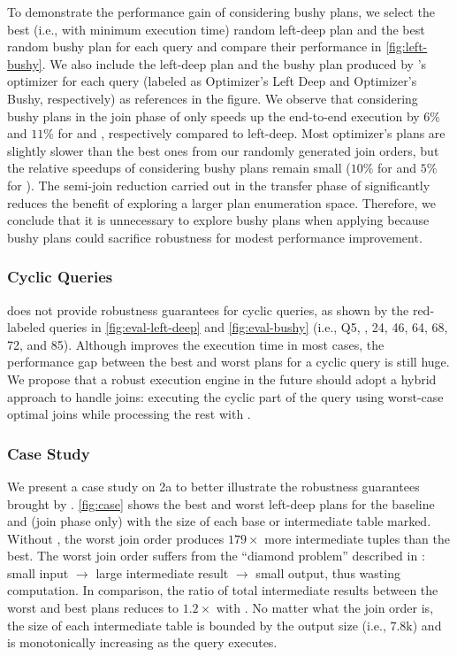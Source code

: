 To demonstrate the performance gain of considering bushy plans, we select the best (i.e., with minimum execution time) random left-deep plan and the best random bushy plan for each query and compare their performance in \cref{fig:left-bushy}. We also include the left-deep plan and the bushy plan produced by \duckdb's optimizer for each query (labeled as Optimizer's Left Deep and Optimizer's Bushy, respectively) as references in the figure. We observe that considering bushy plans in the join phase of \rpt only speeds up the end-to-end execution by $6\%$ and $11\%$ for \tpch and \job, respectively compared to left-deep. Most optimizer's plans are slightly slower than the best ones from our randomly generated join orders, but the relative speedups of considering bushy plans remain small ($10\%$ for \tpch and $5\%$ for \job).
The semi-join reduction carried out in the transfer phase of \rpt significantly reduces the benefit of exploring a larger plan enumeration space. Therefore, we conclude that it is unnecessary to explore bushy plans when applying \RPT because bushy plans could sacrifice robustness for modest performance improvement.


\subsubsection{Cyclic Queries}
\rpt does not provide robustness guarantees for cyclic queries, as shown by the red-labeled queries in \cref{fig:eval-left-deep} and \cref{fig:eval-bushy} (i.e., \tpch Q5, , 24, 46, 64, 68, 72, and 85). Although \rpt improves the execution time in most cases, the performance gap between the best and worst plans for a cyclic query is still huge. We propose that a robust execution engine in the future should adopt a hybrid approach to handle joins: executing the cyclic part of the query using worst-case optimal joins while processing the rest with \RPT.

\subsubsection{Case Study}
We present a case study on \job 2a to better illustrate the robustness guarantees brought by \rpt. \cref{fig:case} shows the best and worst left-deep plans for the baseline and \rpt (join phase only) with the size of each base or intermediate table marked. Without \rpt, the worst join order produces $179\times$ more intermediate tuples than the best. The worst join order suffers from the ``diamond problem'' described in \cite{birler2024robust}: small input $\rightarrow$ large intermediate result $\rightarrow$ small output, thus wasting computation. In comparison, the ratio of total intermediate results between the worst and best plans reduces to $1.2\times$ with \rpt. No matter what the join order is, the size of each intermediate table is bounded by the output size (i.e., 7.8k) and is monotonically increasing as the query executes.

